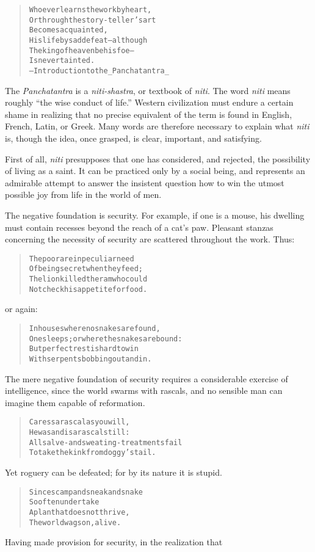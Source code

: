 \documentclass[article, twoside, 14pt]{memoir}
\renewenvironment{verbatim}{%
\begin{quote}%
\vskip -10pt%
\begin{alltt}\normalfont\large}{\end{alltt}%
\end{quote}%
\vskip -10pt
} %
\begin{document}
\begin{verbatim}
Whoever learns the work by heart,
Or through the story-teller's art
    Becomes acquainted,
His life by sad defeat--although
The king of heaven be his foe--
    Is never tainted.
        --Introduction to the _Panchatantra_
\end{verbatim}
The \emph{Panchatantra} is a \emph{niti-shastra}, or textbook of
\emph{niti}. The word \emph{niti} means roughly
``the wise conduct of life.'' Western civilization must endure a
certain shame in realizing that no precise equivalent of the term
is found in English, French, Latin, or Greek. Many words are
therefore necessary to explain what \emph{niti} is, though the
idea, once grasped, is clear, important, and satisfying.

First of all, \emph{niti} presupposes that one has considered, and
rejected, the possibility of living as a saint. It can be practiced
only by a social being, and represents an admirable attempt to
answer the insistent question how to win the utmost possible joy
from life in the world of men.

The negative foundation is security. For example, if one is a
mouse, his dwelling must contain recesses beyond the reach of a
cat's paw. Pleasant stanzas concerning the necessity of security
are scattered throughout the work. Thus:

\begin{verbatim}
The poor are in peculiar need
Of being secret when they feed;
The lion killed the ram who could
Not check his appetite for food.
\end{verbatim}
or again:

\begin{verbatim}
In houses where no snakes are found,
One sleeps; or where the snakes are bound:
But perfect rest is hard to win
With serpents bobbing out and in.
\end{verbatim}
The mere negative foundation of security requires a considerable
exercise of intelligence, since the world swarms with rascals, and
no sensible man can imagine them capable of reformation.

\begin{verbatim}
Caress a rascal as you will,
He was and is a rascal still:
All salve- and sweating-treatments fail
To take the kink from doggy's tail.
\end{verbatim}
Yet roguery can be defeated; for by its nature it is stupid.

\begin{verbatim}
Since scamp and sneak and snake
So often undertake
A plan that does not thrive,
The world wags on, alive.
\end{verbatim}
Having made provision for security, in the realization that
\end{document}
